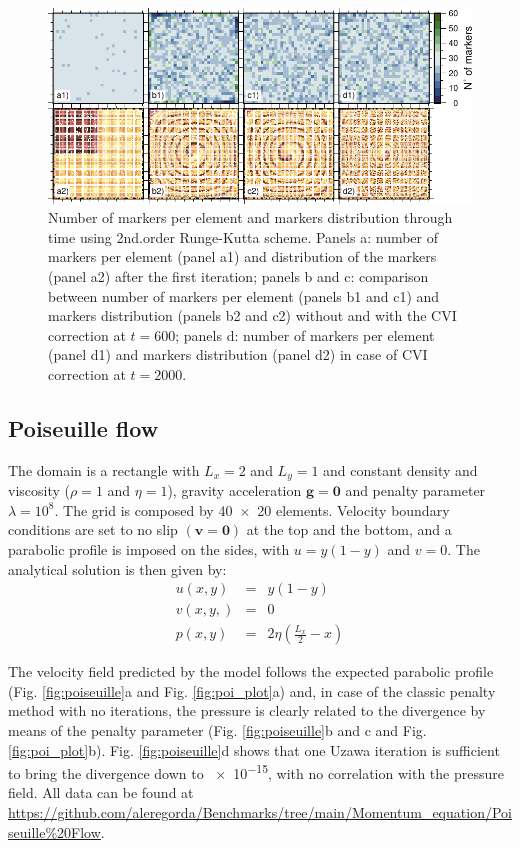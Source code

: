\documentclass[hidelinks,10pt,a4paper]{article}
\begin{document}
\begin{figure}
\centering
\noindent\includegraphics[width=\textwidth]{./Figures/CVI_time.pdf}
\caption{Number of markers per element and markers distribution through time using 2nd.order Runge-Kutta scheme.
Panels a: number of markers per element (panel a1) and distribution of the markers (panel a2) after the first
iteration; panels b and c: comparison between number of markers per element (panels b1 and c1) and markers distribution (panels b2 and c2) without and with
the CVI correction at $t=600$; panels d: number of markers per element (panel d1) and markers distribution (panel d2) in case of CVI correction at $t=2000$.}
\label{fig:CVI_time}
\end{figure}

\subsection{Poiseuille flow}\label{sec:poiseuille}
The domain is a rectangle with $L_x=2$ and $L_y=1$ and constant density and viscosity ($\rho=1$ and $\eta=1$), gravity acceleration $\bm{g}=\bm{0}$ and penalty
parameter $\lambda=10^8$. The grid is composed by \num{40x20} elements. Velocity boundary conditions are set to no slip $(\bm{v}=\bm{0})$ at the top and the
bottom, and a parabolic profile is imposed on the sides, with $u=y(1-y)$ and $v=0$. The analytical solution is then given by:
\begin{eqnarray}
u(x,y)&=&y(1-y)\nonumber \\
v(x,y,)&=&0\nonumber \\
p(x,y)&=&2\eta\left(\frac{L_x}{2}-x\right)\nonumber
\end{eqnarray}

The velocity field predicted by the model follows the expected parabolic profile (Fig. \ref{fig:poiseuille}a and Fig. \ref{fig:poi_plot}a) and, in case of the
classic penalty method with no iterations, the pressure is clearly related to the divergence by means of the penalty parameter (Fig. \ref{fig:poiseuille}b and
c and Fig. \ref{fig:poi_plot}b). Fig. \ref{fig:poiseuille}d shows that one Uzawa iteration is sufficient to bring the divergence down to \num{e-15}, with no
correlation with the pressure field. All data can be found at \url{https://github.com/aleregorda/Benchmarks/tree/main/Momentum_equation/Poiseuille%20Flow}.
\end{document}

